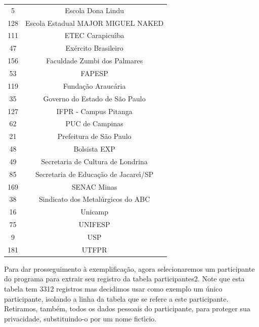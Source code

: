\documentclass[
12pt,		%
openright,	%
twoside,  %
a4paper,			%
chapter=TITLE,		%
english,			%
french,				%
spanish,			%
brazil				%
]{USPSC-classe/USPSC}
\begin{document}
\begin{table}[htb]
\begin{tabular}{|c|c|}
                    5  &  Escola Dona Lindu \\
                  128  &  Escola Estadual MAJOR MIGUEL NAKED \\
                  111  &  ETEC Carapicu\'{\i}ba \\
                   47  &  Ex\'ercito Brasileiro \\
                  156  &  Faculdade Zumbi dos Palmares \\
                   53  &  FAPESP \\
                  119  &  Funda\c{c}\~ao Arauc\'aria \\
                   35  &  Governo do Estado de S\~ao Paulo \\
                  127  &  IFPR - Campus Pitanga \\
                   62  &  PUC de Campinas \\
                   21  &  Prefeitura de S\~ao Paulo           \\
                   48  &  Bolsista EXP \\
                   49  &  Secretaria de Cultura de Londrina \\
                   85  &  Secretaria de Educa\c{c}\~ao de Jacare\'{\i}/SP \\
                  169  &  SENAC Minas  \\
                   38  &  Sindicato dos Metal\'urgicos do ABC \\
                   16  &  Unicamp \\
                   75  &  UNIFESP  \\
                    9  &  USP \\
                  181  &  UTFPR \\
\hline
\end{tabular}
\end{table}


Para dar prosseguimento \`a exemplifica\c{c}\~ao, agora selecionaremos um participante do programa para extrair seu registro da tabela \textquotedbl participantes2\textquotedbl . Note que esta tabela tem 3312 registros mas decidimos usar como exemplo um \'unico participante, isolando a linha da tabela que se refere a este participante. Retiramos, tamb\'em, todos os dados pessoais do participante, para proteger sua privacidade, substituindo-o por um nome fict\'{\i}cio.
\end{document}
